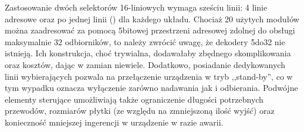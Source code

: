 Zastosowanie dwóch selektorów 16-liniowych wymaga sześciu linii: 4 linie adresowe oraz po jednej linii  () dla każdego układu.
Chociaż 20 użytych modułów można zaadresować za pomocą 5\ppauza{}bitowej przestrzeni adresowej zdolnej do obsługi maksymalnie 32 odbiorników, to należy zwrócić uwagę, że dekodery 5\ppauza{}do\ppauza{}32 nie istnieją.
Ich konstrukcja, choć trywialna, dodawałaby zbędnego skomplikowania oraz kosztów, dając w zamian niewiele.
Dodatkowo, posiadanie dedykowanych linii wybierających pozwala na przełączenie urządzenia w tryb ,,stand-by'', co w tym wypadku oznacza wyłączenie zarówno nadawania jak i odbierania.
Podwójne elementy sterujące umożliwiają także ograniczenie długości potrzebnych przewodów, rozmiarów płytki (ze względu na zmniejszoną ilość wyjść) oraz konieczność mniejszej ingerencji w urządzenie w razie awarii.\\

